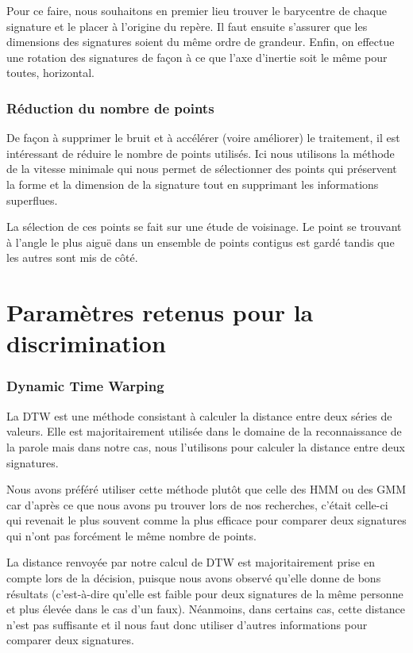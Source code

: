 \documentclass[fontsize=10pt, twoside=no]{scrartcl} %
\begin{document}
Pour ce faire, nous souhaitons en premier lieu trouver le barycentre de chaque signature et le placer à l'origine du repère. Il faut ensuite s'assurer que les dimensions des signatures soient du même ordre de grandeur. Enfin, on effectue une rotation des signatures de façon à ce que l'axe d'inertie soit le même pour toutes, horizontal.

\section{Réduction du nombre de points}

De façon à supprimer le bruit et à accélérer (voire améliorer) le traitement, il est intéressant de réduire le nombre de points utilisés. Ici nous utilisons la méthode de la vitesse minimale qui nous permet de sélectionner des points qui préservent la forme et la dimension de la signature tout en supprimant les informations superflues.

La sélection de ces points se fait sur une étude de voisinage. Le point se trouvant à l'angle le plus aiguë dans un ensemble de points contigus est gardé tandis que les autres sont mis de côté.

\part{Paramètres retenus pour la discrimination}

\section{Dynamic Time Warping}

La DTW est une méthode consistant à calculer la distance entre deux séries de valeurs. Elle est majoritairement utilisée dans le domaine de la reconnaissance de la parole mais dans notre cas, nous l'utilisons pour calculer la distance entre deux signatures.

Nous avons préféré utiliser cette méthode plutôt que celle des HMM ou des GMM car d'après ce que nous avons pu trouver lors de nos recherches, c'était celle-ci qui revenait le plus souvent comme la plus efficace pour comparer deux signatures qui n'ont pas forcément le même nombre de points.

La distance renvoyée par notre calcul de DTW est majoritairement prise en compte lors de la décision, puisque nous avons observé qu'elle donne de bons résultats (c'est-à-dire qu'elle est faible pour deux signatures de la même personne et plus élevée dans le cas d'un faux). Néanmoins, dans certains cas, cette distance n'est pas suffisante et il nous faut donc utiliser d'autres informations pour comparer deux signatures.
\end{document}
